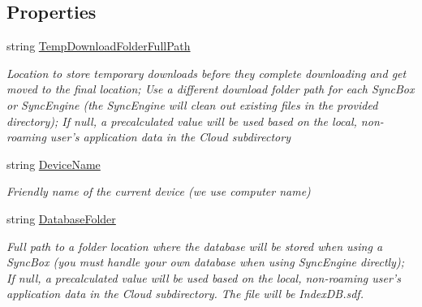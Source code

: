 \subsection*{Properties}
\begin{DoxyCompactItemize}
\item 
string \hyperlink{interface_cloud_api_public_1_1_interfaces_1_1_i_sync_settings_advanced_ad7bd9a4765d6090a05a97222c8cfd222}{Temp\-Download\-Folder\-Full\-Path}
\begin{DoxyCompactList}\small\item\em Location to store temporary downloads before they complete downloading and get moved to the final location; Use a different download folder path for each Sync\-Box or Sync\-Engine (the Sync\-Engine will clean out existing files in the provided directory); If null, a precalculated value will be used based on the local, non-\/roaming user's application data in the Cloud subdirectory \end{DoxyCompactList}\item 
string \hyperlink{interface_cloud_api_public_1_1_interfaces_1_1_i_sync_settings_advanced_a6c77d27d7e668673e0739f84d500e5f4}{Device\-Name}
\begin{DoxyCompactList}\small\item\em Friendly name of the current device (we use computer name) \end{DoxyCompactList}\item 
string \hyperlink{interface_cloud_api_public_1_1_interfaces_1_1_i_sync_settings_advanced_a3e0380120ac6062772306878cb2a948c}{Database\-Folder}
\begin{DoxyCompactList}\small\item\em Full path to a folder location where the database will be stored when using a Sync\-Box (you must handle your own database when using Sync\-Engine directly); If null, a precalculated value will be used based on the local, non-\/roaming user's application data in the Cloud subdirectory. The file will be Index\-D\-B.\-sdf. \end{DoxyCompactList}\end{DoxyCompactItemize}


